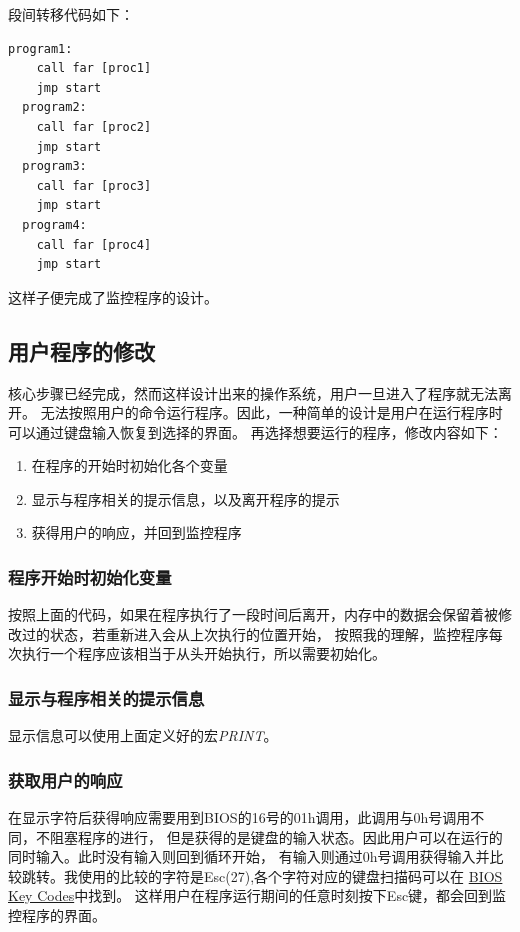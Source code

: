 \documentclass[a4paper, 11pt]{article} %
\newcounter{code}
\begin{document}
段间转移代码如下：
\begin{lstlisting}[language={[x86masm]Assembler},label=WaitForKey,caption=获得键盘输入并跳转]
  program1:
  	call far [proc1]
	jmp start
  program2:
  	call far [proc2]
	jmp start
  program3:
  	call far [proc3]
	jmp start
  program4:
  	call far [proc4]
	jmp start
\end{lstlisting}
这样子便完成了监控程序的设计。


\subsection{用户程序的修改}

核心步骤已经完成，然而这样设计出来的操作系统，用户一旦进入了程序就无法离开。
无法按照用户的命令运行程序。因此，一种简单的设计是用户在运行程序时可以通过键盘输入恢复到选择的界面。
再选择想要运行的程序，修改内容如下：

\begin{enumerate}
  \item 在程序的开始时初始化各个变量
  \item 显示与程序相关的提示信息，以及离开程序的提示
  \item 获得用户的响应，并回到监控程序
\end{enumerate}

\subsubsection{程序开始时初始化变量}

按照上面的代码，如果在程序执行了一段时间后离开，内存中的数据会保留着被修改过的状态，若重新进入会从上次执行的位置开始，
按照我的理解，监控程序每次执行一个程序应该相当于从头开始执行，所以需要初始化。

\subsubsection{显示与程序相关的提示信息}

显示信息可以使用上面定义好的宏\textit{PRINT}。

\subsubsection{获取用户的响应}

在显示字符后获得响应需要用到BIOS的16号的01h调用，此调用与0h号调用不同，不阻塞程序的进行，
但是获得的是键盘的输入状态。因此用户可以在运行的同时输入。此时没有输入则回到循环开始，
有输入则通过0h号调用获得输入并比较跳转。我使用的比较的字符是Esc(27),各个字符对应的键盘扫描码可以在
\href{https://www.fountainware.com/EXPL/bios_key_codes.htm}{BIOS Key Codes}中找到。
这样用户在程序运行期间的任意时刻按下Esc键，都会回到监控程序的界面。
\end{document}
